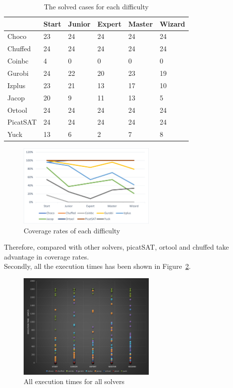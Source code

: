 \begin{table}[htbp]
\centering
\caption{The solved cases for each difficulty}
\label{tab:solvedcaseforeach difficulty}
\begin{tabular}{|l|l|l|l|l|l|}
\hline
	    &Start&	Junior&	Expert&	Master&	Wizard\\
\hline
Choco   &23   &24 &24 &24 &24\\
\hline
Chuffed	&24   &24 &24 &24 &24\\
\hline
Coinbc	&4    &0  &0  &	0 &0\\
\hline
Gurobi	&24   &22 &20 &	23&19\\
\hline
Izplus	&23   &21 &13 &	17&10\\
\hline
Jacop	&20   &9  &11 &13 &5\\
\hline
Ortool	&24   &24 &24 &	24&24\\
\hline
PicatSAT&24   &24 &24 &24 &24\\
\hline
Yuck    &13	  &6  &2  &7  &8\\
\hline
\end{tabular}
\end{table}
\begin{figure}[H]
    \centering
    \includegraphics[width=0.6\textwidth]{figs/separated coverage.png}
    \caption{Coverage rates of each difficulty}
    \label{fig:comparisonIQtwist}
\end{figure}
Therefore, compared with other solvers, picatSAT, ortool and chuffed take advantage in coverage rates.
\\Secondly, all the execution times has been shown in Figure~\ref{fig:execution times}.
\begin{figure}[H]
    \centering
    \includegraphics[width=0.6\textwidth]{figs/all_point_IQtwist.png}
    \caption{All execution times for all solvers}
    \label{fig:execution times}
\end{figure}

